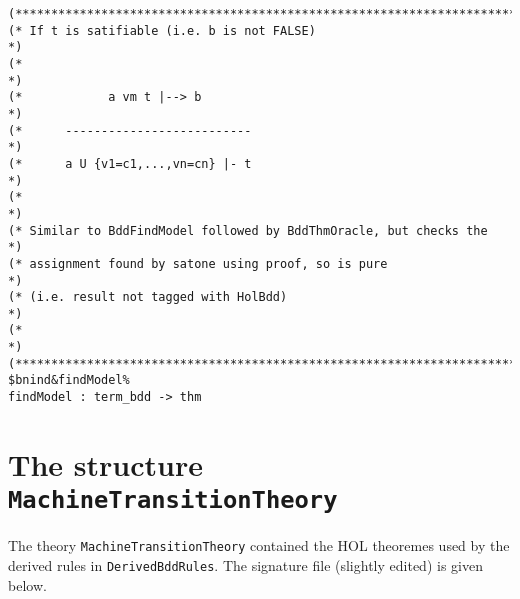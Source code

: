 \documentclass[12pt]{article}
\renewcommand{\t}[1]{\mbox{\tt #1}}
\begin{document}
\begin{footnotesize}
\begin{Verbatim}[commandchars=\$\&\%]
(*****************************************************************************)
(* If t is satifiable (i.e. b is not FALSE)                                  *)
(*                                                                           *)
(*            a vm t |--> b                                                  *)
(*      --------------------------                                           *)
(*      a U {v1=c1,...,vn=cn} |- t                                           *)
(*                                                                           *)
(* Similar to BddFindModel followed by BddThmOracle, but checks the          *)
(* assignment found by satone using proof, so is pure                        *)
(* (i.e. result not tagged with HolBdd)                                      *)
(*                                                                           *)
(*****************************************************************************)
$bnind&findModel%
findModel : term_bdd -> thm
\end{Verbatim}
\end{footnotesize}

\section{The structure \t{MachineTransitionTheory}}\label{MachineTransitionTheory}

The theory \t{MachineTransitionTheory} contained the HOL theoremes used
by the derived rules in \t{DerivedBddRules}. The signature file
(slightly edited) is given below.
\end{document}
